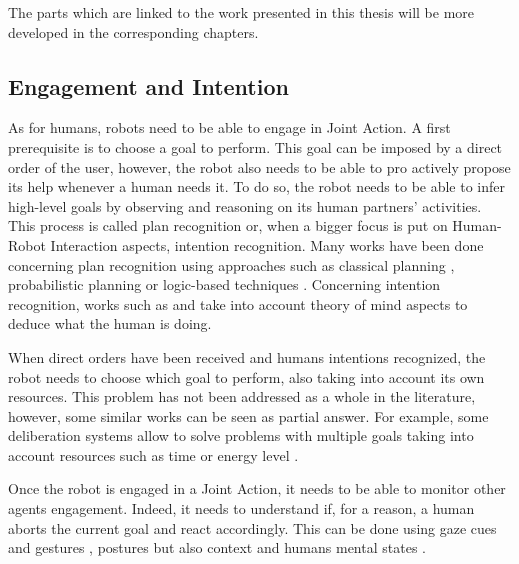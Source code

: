 \documentclass[english,a4paper,11pt,twoside]{StyleThese}
\begin{document}
The parts which are linked to the work presented in this thesis will be more developed in the corresponding chapters.

\subsection{Engagement and Intention}

\label{subsec:engagement}

As for humans, robots need to be able to engage in Joint Action. A first prerequisite is to choose a goal to perform. This goal can be imposed by a direct order of the user, however, the robot also needs to be able to pro actively propose its help whenever a human needs it. To do so, the robot needs to be able to infer high-level goals by observing and reasoning on its human partners’ activities. This process is called plan recognition or, when a bigger focus is put on Human-Robot Interaction aspects, intention recognition. Many works have been done concerning plan recognition using approaches such as classical planning \cite{ramirez2009plan}, probabilistic planning \cite{bui2003general} or logic-based techniques \cite{singla2011abductive}. Concerning intention recognition, works such as \cite{breazeal2009embodied} and \cite{baker2014modeling} take into account theory of mind aspects to deduce what the human is doing.

When direct orders have been received and humans intentions recognized, the robot needs to choose which goal to perform, also taking into account its own resources. This problem has not been addressed as a whole in the literature, however, some similar works can be seen as partial answer. For example, some deliberation systems allow to solve problems with multiple goals taking into account resources such as time \cite{georgeff1987reactive, ghallab1994representation, lemai2004interleaving} or energy level \cite{rabideau1999iterative}.

Once the robot is engaged in a Joint Action, it needs to be able to monitor other agents engagement. Indeed, it needs to understand if, for a reason, a human aborts the current goal and react accordingly. This can be done using gaze cues and gestures \cite{rich2010recognizing}, postures \cite{sanghvi2011automatic} but also context and humans mental states \cite{salam2015multi}.
\end{document}
